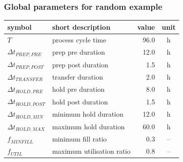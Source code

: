 \documentclass{beamer}
\begin{document}
\begin{frame}
    \frametitle{Global parameters for random example}
    \begin{table}
        \begin{tabular}{l | l | r | c}
            symbol & short description & value & unit\\ \hline
            $T$ & process cycle time & 96.0 & h\\
            $\Delta t_{\mathit{PREP,PRE}}$ & prep pre duration & 12.0 & h\\
            $\Delta t_{\mathit{PREP,POST}}$ & prep post duration & 1.5 & h\\
            $\Delta t_{\mathit{TRANSFER}}$ & transfer duration & 2.0 & h\\
            $\Delta t_{\mathit{HOLD,PRE}}$ & hold pre duration & 8.0 & h\\
            $\Delta t_{\mathit{HOLD,POST}}$ & hold post duration & 1.5 & h\\
            $\Delta t_{\mathit{HOLD,MIN}}$ & minimum hold duration & 12.0 & h\\
            $\Delta t_{\mathit{HOLD,MAX}}$ & maximum hold duration & 60.0 & h\\
            $f_{\mathit{MINFILL}}$ & minimum fill ratio & 0.3 & --\\
            $f_{\mathit{UTIL}}$ & maximum utilisation ratio & 0.8 & --\\
        \end{tabular}
    \end{table}
\end{frame}
\end{document}
